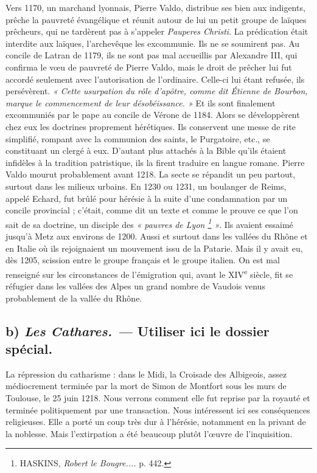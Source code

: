 \documentclass[french,twoside]{book} %
\begin{document}
Vers 1170, un marchand lyonnais, Pierre Valdo, distribue ses bien aux indigents, prêche la pauvreté évangélique et réunit autour de lui un petit groupe de laïques prêcheurs, qui ne tardèrent pas à s’appeler {\itshape Pauperes Christi}. La prédication était interdite aux laïques, l’archevêque les excommunie. Ils ne se soumirent pas. Au concile de Latran de 1179, ils ne sont pas mal accueillis par Alexandre III, qui confirma le vœu de pauvreté de Pierre Valdo, mais le droit de prêcher lui fut accordé seulement avec l’autorisation de l’ordinaire. Celle-ci lui étant refusée, ils persévèrent. \emph{« Cette usurpation du rôle d’apôtre, comme dit Étienne de Bourbon, marque le commencement de leur désobéissance. »} Et ils sont finalement excommuniés par le pape au concile de Vérone de 1184. Alors se développèrent chez eux les doctrines proprement hérétiques. Ils conservent une messe de rite simplifié, rompant avec la communion des saints, le Purgatoire, etc., se constituant un clergé à eux. D’autant plus attachés à la Bible qu’ils étaient infidèles à la tradition patristique, ils la firent traduire en langue romane. Pierre Valdo mourut probablement avant 1218. La secte se répandit un peu partout, surtout dans les milieux urbains. En 1230 ou 1231, un boulanger de Reims, appelé Echard, fut brûlé pour hérésie à la suite d’une condamnation par un concile provincial ; c’était, comme dit un texte et comme le prouve ce que l’on sait de sa doctrine, un disciple des \emph{« pauvres de Lyon \footnote{ HASKINS, {\itshape Robert le Bougre....} p. 442.} »}. Ils avaient essaimé jusqu’à Metz aux environs de 1200. Aussi et surtout dans les vallées du Rhône et en Italie où ils rejoignaient un mouvement issu de la Patarie. Mais il y avait eu, dès 1205, scission entre le groupe français et le groupe italien. On est mal renseigné sur les circonstances de l’émigration qui, avant le XIV\textsuperscript{e} siècle, fit se réfugier dans les vallées des Alpes un grand nombre de Vaudois venus probablement de la vallée du Rhône.
\subsection[b) Les Cathares. — Utiliser ici le dossier spécial.]{b) {\itshape Les Cathares. —} Utiliser ici le dossier spécial.}
\noindent La répression du catharisme : dans le Midi, la Croisade des Albigeois, assez médiocrement terminée par la mort de Simon de  
\label{p104} Montfort sous les murs de Toulouse, le 25 juin 1218. Nous verrons comment elle fut reprise par la royauté et terminée politiquement par une transaction. Nous intéressent ici ses conséquences religieuses. Elle a porté un coup très dur à l’hérésie, notamment en la privant de la noblesse. Mais l’extirpation a été beaucoup plutôt l’œuvre de l’inquisition.
\end{document}
